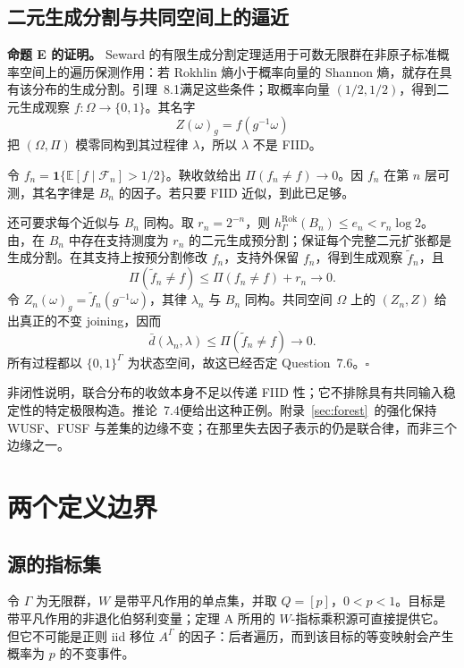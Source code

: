 \documentclass[UTF8,zihao=-4,a4paper]{ctexart}
\numberwithin{equation}{section}
\newcommand{\EE}{\mathbb E}
\begin{document}
\subsection{二元生成分割与共同空间上的逼近}

\textbf{命题 E 的证明。}
Seward 的有限生成分割定理适用于可数无限群在非原子标准概率空间上的遍历保测作用：若 Rokhlin 熵小于概率向量的 Shannon 熵，就存在具有该分布的生成分割\cite[Theorem~1.1]{Seward}。引理~8.1满足这些条件；取概率向量 $(1/2,1/2)$，得到二元生成观察 $f:\Omega\to\{0,1\}$。其名字
\[
 Z(\omega)_g=f(g^{-1}\omega)
\]
把 $(\Omega,\Pi)$ 模零同构到其过程律 $\lambda$，所以 $\lambda$ 不是 FIID。

令 $f_n=\mathbf1\{\EE[f\mid\mathcal F_n]>1/2\}$。鞅收敛给出
$\Pi(f_n\ne f)\to0$。因 $f_n$ 在第 $n$ 层可测，其名字律是 $B_n$ 的因子。若只要 FIID 近似，到此已足够。

还可要求每个近似与 $B_n$ 同构。取 $r_n=2^{-n}$，则
$h^{\mathrm{Rok}}_\Gamma(B_n)\le e_n<r_n\log2$。
由\cite[Theorem~2.3]{Seward}，在 $B_n$ 中存在支持测度为 $r_n$ 的二元生成预分割；\cite[Lemma~2.2]{Seward}保证每个完整二元扩张都是生成分割。在其支持上按预分割修改 $f_n$，支持外保留 $f_n$，得到生成观察 $\widetilde f_n$，且
\[
 \Pi(\widetilde f_n\ne f)
 \le\Pi(f_n\ne f)+r_n\longrightarrow0.
\]
令 $Z_n(\omega)_g=\widetilde f_n(g^{-1}\omega)$，其律 $\lambda_n$ 与 $B_n$ 同构。共同空间 $\Omega$ 上的 $(Z_n,Z)$ 给出真正的不变 joining，因而
\begin{equation}\label{short:bard}
 \bar d(\lambda_n,\lambda)
 \le\Pi(\widetilde f_n\ne f)\longrightarrow0.
\end{equation}
所有过程都以 $\{0,1\}^\Gamma$ 为状态空间，故这已经否定 Question~7.6。\hfill$\square$

非闭性说明，联合分布的收敛本身不足以传递 FIID 性；它不排除具有共同输入稳定性的特定极限构造。推论~7.4便给出这种正例。附录~\ref{sec:forest}~的强化保持 WUSF、FUSF 与差集的边缘不变；在那里失去因子表示的仍是联合律，而非三个边缘之一。

\label{sec:mainend}

\clearpage
\appendix
\section{两个定义边界}\label{sec:appendices}

\subsection{源的指标集}

令 \(\Gamma\) 为无限群，\(W\) 是带平凡作用的单点集，并取
\(Q=[p]\)，\(0<p<1\)。目标是带平凡作用的非退化伯努利变量；定理 A 所用的 \(W\)-指标乘积源可直接提供它。但它不可能是正则 iid 移位 \(A^\Gamma\) 的因子：后者遍历，而到该目标的等变映射会产生概率为 \(p\) 的不变事件。
\end{document}
